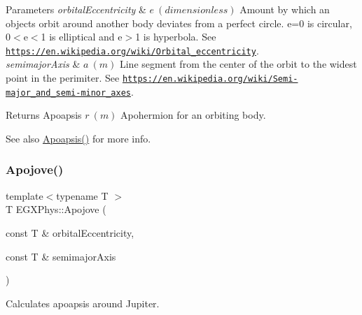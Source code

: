 \begin{DoxyParams}{Parameters}
{\em orbital\+Eccentricity} & $ e\ (dimensionless)$ Amount by which an objects orbit around another body deviates from a perfect circle. e=0 is circular, 0$<$e$<$1 is elliptical and e$>$1 is hyperbola. See \href{https://en.wikipedia.org/wiki/Orbital_eccentricity}{\tt https\+://en.\+wikipedia.\+org/wiki/\+Orbital\+\_\+eccentricity}. \\
\hline
{\em semimajor\+Axis} & $ a\ (m)$ Line segment from the center of the orbit to the widest point in the perimiter. See \href{https://en.wikipedia.org/wiki/Semi-major_and_semi-minor_axes}{\tt https\+://en.\+wikipedia.\+org/wiki/\+Semi-\/major\+\_\+and\+\_\+semi-\/minor\+\_\+axes}. \\
\hline
\end{DoxyParams}
\begin{DoxyReturn}{Returns}
Apoapsis $ r\ (m)$ Apohermion for an orbiting body. 
\end{DoxyReturn}
\begin{DoxySeeAlso}{See also}
\mbox{\hyperlink{group___e_g_x_phys-_apoapsis_gaf962e650bf84a568458e8eb39b1c61ba}{Apoapsis()}} for more info. 
\end{DoxySeeAlso}
\mbox{\label{group___e_g_x_phys-_apoapsis_ga5a45d0a873514113aaa0adc95aefbbde}} 
\subsubsection{\texorpdfstring{Apojove()}{Apojove()}}
{\footnotesize\ttfamily template$<$typename T $>$ \\
T E\+G\+X\+Phys\+::\+Apojove (\begin{DoxyParamCaption}\item[{const T \&}]{orbital\+Eccentricity,  }\item[{const T \&}]{semimajor\+Axis }\end{DoxyParamCaption})}



Calculates apoapsis around Jupiter. 


